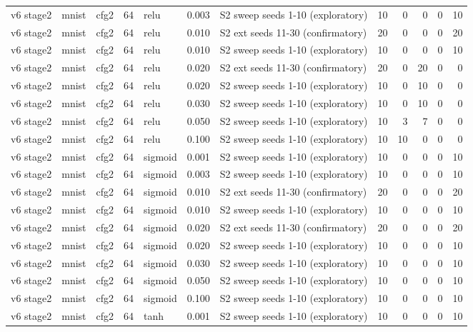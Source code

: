 \begin{table}[htbp]
{\begin{tabular}{@{}lllrlrlrrrrr@{}}
v6 stage2 & mnist & cfg2 & 64 & relu & 0.003 & S2 sweep seeds 1-10 (exploratory) & 10 & 0 & 0 & 0 & 10 \\
v6 stage2 & mnist & cfg2 & 64 & relu & 0.010 & S2 ext seeds 11-30 (confirmatory) & 20 & 0 & 0 & 0 & 20 \\
v6 stage2 & mnist & cfg2 & 64 & relu & 0.010 & S2 sweep seeds 1-10 (exploratory) & 10 & 0 & 0 & 0 & 10 \\
v6 stage2 & mnist & cfg2 & 64 & relu & 0.020 & S2 ext seeds 11-30 (confirmatory) & 20 & 0 & 20 & 0 & 0 \\
v6 stage2 & mnist & cfg2 & 64 & relu & 0.020 & S2 sweep seeds 1-10 (exploratory) & 10 & 0 & 10 & 0 & 0 \\
v6 stage2 & mnist & cfg2 & 64 & relu & 0.030 & S2 sweep seeds 1-10 (exploratory) & 10 & 0 & 10 & 0 & 0 \\
v6 stage2 & mnist & cfg2 & 64 & relu & 0.050 & S2 sweep seeds 1-10 (exploratory) & 10 & 3 & 7 & 0 & 0 \\
v6 stage2 & mnist & cfg2 & 64 & relu & 0.100 & S2 sweep seeds 1-10 (exploratory) & 10 & 10 & 0 & 0 & 0 \\
v6 stage2 & mnist & cfg2 & 64 & sigmoid & 0.001 & S2 sweep seeds 1-10 (exploratory) & 10 & 0 & 0 & 0 & 10 \\
v6 stage2 & mnist & cfg2 & 64 & sigmoid & 0.003 & S2 sweep seeds 1-10 (exploratory) & 10 & 0 & 0 & 0 & 10 \\
v6 stage2 & mnist & cfg2 & 64 & sigmoid & 0.010 & S2 ext seeds 11-30 (confirmatory) & 20 & 0 & 0 & 0 & 20 \\
v6 stage2 & mnist & cfg2 & 64 & sigmoid & 0.010 & S2 sweep seeds 1-10 (exploratory) & 10 & 0 & 0 & 0 & 10 \\
v6 stage2 & mnist & cfg2 & 64 & sigmoid & 0.020 & S2 ext seeds 11-30 (confirmatory) & 20 & 0 & 0 & 0 & 20 \\
v6 stage2 & mnist & cfg2 & 64 & sigmoid & 0.020 & S2 sweep seeds 1-10 (exploratory) & 10 & 0 & 0 & 0 & 10 \\
v6 stage2 & mnist & cfg2 & 64 & sigmoid & 0.030 & S2 sweep seeds 1-10 (exploratory) & 10 & 0 & 0 & 0 & 10 \\
v6 stage2 & mnist & cfg2 & 64 & sigmoid & 0.050 & S2 sweep seeds 1-10 (exploratory) & 10 & 0 & 0 & 0 & 10 \\
v6 stage2 & mnist & cfg2 & 64 & sigmoid & 0.100 & S2 sweep seeds 1-10 (exploratory) & 10 & 0 & 0 & 0 & 10 \\
v6 stage2 & mnist & cfg2 & 64 & tanh & 0.001 & S2 sweep seeds 1-10 (exploratory) & 10 & 0 & 0 & 0 & 10 \\

\end{tabular}}
\end{table}
